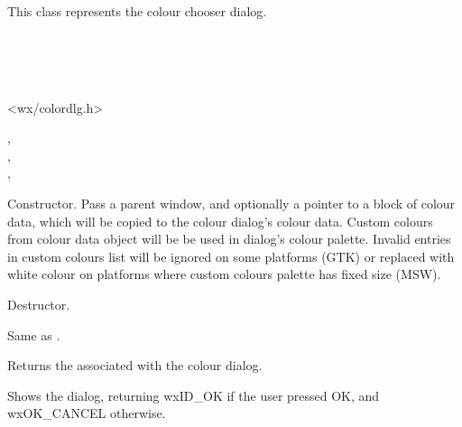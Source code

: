 \section{}\label{wxcolourdialog}

This class represents the colour chooser dialog.


\\
\\
\\


<wx/colordlg.h>


,\\
,\\
,\\


\label{wxcolourdialogwxcolourdialog}


Constructor. Pass a parent window, and optionally a pointer to a block of colour
data, which will be copied to the colour dialog's colour data. Custom
colours from colour data object will be be used in dialog's colour palette.
Invalid entries in custom colours list will be ignored on some platforms (GTK)
or replaced with white colour on platforms where custom colours palette has
fixed size (MSW).





Destructor.



Same as .



Returns the  associated with the colour dialog.



Shows the dialog, returning wxID\_OK if the user pressed OK, and wxOK\_CANCEL
otherwise.


